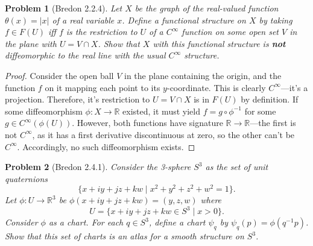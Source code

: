 \documentclass{article}
\newtheorem{plm}{Problem}
\begin{document}
\begin{plm}[Bredon 2.2.4]
  Let $X$ be the graph of the real-valued function $\theta(x) = |x|$ of a real variable $x$.
  Define a functional structure on $X$ by taking $f \in F(U)$ iff $f$ is the restriction to $U$ of a $C^{\infty}$ function
  on some open set $V$ in the plane with $U = V \cap X$.
  Show that $X$ with this functional structure is \textbf{not} diffeomorphic to the real line with the usual $C^{\infty}$ structure.
\end{plm}

\begin{proof}
  Consider the open ball $V$ in the plane containing the origin, and the function $f$ on it mapping each point to its $y$-coordinate.
  This is clearly $C^{\infty}$---it's a projection.
  Therefore, it's restriction to $U = V \cap X$ is in $F(U)$ by definition.
  If some diffeomorphism $\phi: X \to \mathbb{R}$ existed, it must yield $f = g \circ \phi^{-1}$ for some $g \in C^{\infty}(\phi(U))$.
  However, both functions have signature $\mathbb{R} \to \mathbb{R}$---the first is not $C^{\infty}$,
  as it has a first derivative discontinuous at zero, so the other can't be $C^{\infty}$.
  Accordingly, no such diffeomorphism exists.
\end{proof}

\begin{plm}[Bredon 2.4.1]
  Consider the 3-sphere $S^{3}$ as the set of unit quaternions
  \[
    \{x + iy + jz + kw \mid x^{2} + y^{2} + z^{2} + w^{2} = 1\}.
  \]
  Let $\phi: U \to \mathbb{R}^{3}$  be $\phi(x + iy + jz + kw) = (y, z, w)$ where
  \[
    U = \{x + iy + jz + kw \in S^{3} \mid x  > 0\}.
  \]
  Consider $\phi$ as a chart.
  For each $q \in S^{3}$, define a chart $\psi_{q}$ by $\psi_{q}(p) = \phi(q^{-1}p)$.
  Show that this set of charts is an atlas for a smooth structure on $S^{3}$.
\end{plm}
\end{document}
